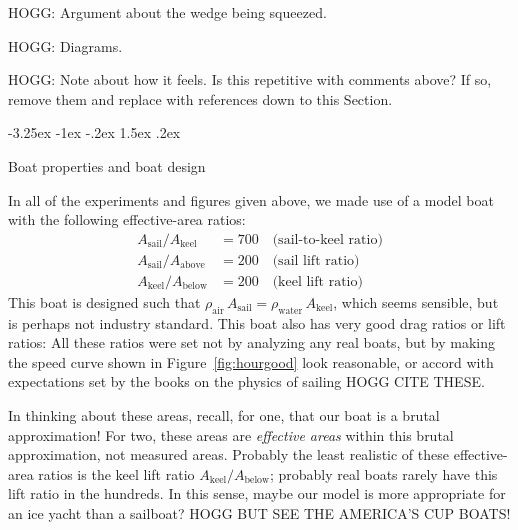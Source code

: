\documentclass[letterpaper]{article}
\makeatletter
\newcommand{\air}{\text{air}}
\newcommand{\water}{\text{water}}
\newcommand{\sail}{\text{sail}}
\newcommand{\keel}{\text{keel}}
\renewcommand{\above}{\text{above}}
\newcommand{\below}{\text{below}}
\newcommand{\figref}[1]{Figure~\ref{#1}}
\renewcommand\section{\@startsection {section}{1}{\z@}%
  {-3.25ex \@plus -1ex \@minus -.2ex}%
  {1.5ex \@plus .2ex}%
  {\raggedright\normalfont\large\bfseries}}
\makeatother
\begin{document}
HOGG: Argument about the wedge being squeezed.

HOGG: Diagrams.

HOGG: Note about how it feels. Is this repetitive with comments above? If so, remove them and replace with references down to this Section.

\section{Boat properties and boat design}\label{sec:design}

In all of the experiments and figures given above, we made use of a model boat with the following effective-area ratios:
\begin{align}
  A_\sail / A_\keel &= 700 \quad\mbox{(sail-to-keel ratio)}\label{eq:boat1}\\
  A_\sail / A_\above &= 200 \quad\mbox{(sail lift ratio)}\\
  A_\keel / A_\below &= 200 \quad\mbox{(keel lift ratio)}\label{eq:boat4}
\end{align}
This boat is designed such that $\rho_\air\,A_\sail = \rho_\water\,A_\keel$, which seems sensible, but is perhaps not industry standard.
This boat also has very good drag ratios or lift ratios:
All these ratios were set not by analyzing any real boats, but by making the speed curve shown in \figref{fig:hourgood} look reasonable, or accord with expectations set by the books on the physics of sailing HOGG CITE THESE.

In thinking about these areas, recall, for one, that our boat is a brutal approximation!
For two, these areas are \emph{effective areas} within this brutal approximation, not measured areas.
Probably the least realistic of these effective-area ratios is the keel lift ratio $A_\keel/A_\below$; probably real boats rarely have this lift ratio in the hundreds.
In this sense, maybe our model is more appropriate for an ice yacht than a sailboat?
HOGG BUT SEE THE AMERICA'S CUP BOATS!
\end{document}

